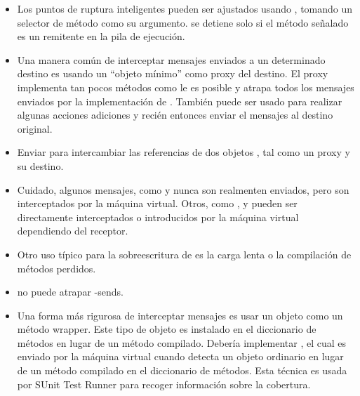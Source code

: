 \documentclass[a4paper,10pt,twoside]{book}
\begin{document}
\begin{itemize}
\item Los puntos de ruptura inteligentes pueden ser ajustados usando , tomando un selector de m\'etodo como su argumento.  se detiene solo si el m\'etodo se\~nalado es un remitente en la pila de ejecuci\'on.
\item Una manera com\'un de interceptar mensajes enviados a un determinado destino es usando un ``objeto m\'inimo'' como proxy del destino. El proxy implementa tan pocos m\'etodos como le es posible y atrapa todos los mensajes enviados por la implementaci\'on de . Tambi\'en puede ser usado para realizar algunas acciones adiciones y reci\'en entonces enviar el mensajes al destino original.
\item Enviar  para intercambiar las referencias de dos objetos , tal como un proxy y su destino.
\item Cuidado, algunos mensajes, como   y  nunca son realmenten enviados, pero son interceptados por la m\'aquina virtual. Otros, como \ct{+},  y \ct{-} pueden ser directamente interceptados o introducidos por la m\'aquina virtual dependiendo del receptor.
\item Otro uso t\'ipico para la sobreescritura de  es la carga  lenta o la compilaci\'on de m\'etodos perdidos.
\item {} no puede atrapar \self-sends.
\item Una forma m\'as rigurosa de interceptar mensajes es usar un objeto como un m\'etodo wrapper. Este tipo de objeto es instalado en el diccionario de m\'etodos en lugar de un m\'etodo compilado.  Deber\'ia implementar , el cual es enviado por la m\'aquina virtual cuando detecta un objeto ordinario en lugar de un m\'etodo compilado en el diccionario de m\'etodos. Esta t\'ecnica es usada por SUnit Test Runner para recoger informaci\'on sobre la cobertura.
\end{itemize}

\ifx\wholebook\relax\else
   
   
\end{document}
